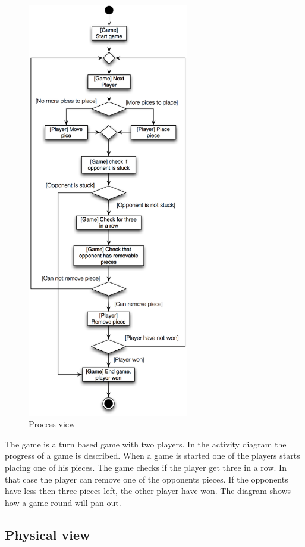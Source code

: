 \begin{figure}[H]
\begin{center}
\includegraphics[width=200pt]{./Images/ProcessView}
\end{center}
\caption{Process view}
\end{figure}

The game is a turn based game with two players. In the activity diagram the progress of a game is described. When a game is started one of the players starts placing one of his pieces. The game checks if the player get three in a row. In that case the player can remove one of the opponents pieces. If the opponents have less then three pieces left, the other player have won. The diagram shows how a game round will pan out. 

\subsection{Physical view}


